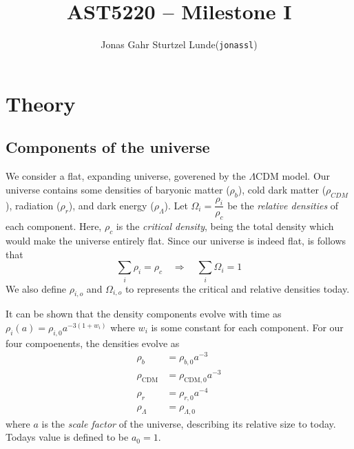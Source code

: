 \documentclass[10pt, a4paper]{article}
\begin{document}
\title{AST5220 -- Milestone I}
\author{
    \begin{tabular}{r l}
        Jonas Gahr Sturtzel Lunde & (\texttt{jonassl})
    \end{tabular}}

\maketitle
\vspace{2cm}

\section{Theory}
\subsection{Components of the universe}
We consider a flat, expanding universe, goverened by the $\Lambda \text{CDM}$ model. Our universe contains some densities of baryonic matter ($\rho_b$), cold dark matter ($\rho_{CDM}$), radiation ($\rho_r$), and dark energy ($\rho_\Lambda$). Let $\Omega_i = \dfrac{\rho_i}{\rho_c}$ be the \textit{relative densities} of each component. Here, $\rho_c$ is the \textit{critical density}, being the total density which would make the universe entirely flat. Since our universe is indeed flat, is follows that
\begin{equation}\label{eqn:sum1}
    \sum_i \rho_i = \rho_c \quad \Rightarrow \quad \sum_i \Omega_i = 1
\end{equation}
We also define $\rho_{i,o}$ and $\Omega_{i,o}$ to represents the critical and relative densities today.

It can be shown \cite{ModernCosmology2003} that the density components evolve with time as $\rho_i(a) = \rho_{i,0}a^{-3(1+w_i)}$ where $w_i$ is some constant for each component. For our four compoenents, the densities evolve as
\begin{align*}
    \rho_b &= \rho_{b,0} a^{-3} \\
    \rho_\text{CDM} &= \rho_{\text{CDM},0} a^{-3} \\
    \rho_r &= \rho_{r,0} a^{-4} \\
    \rho_\Lambda &= \rho_{\Lambda,0}
\end{align*}
where $a$ is the \textit{scale factor} of the universe, describing its relative size to today. Todays value is defined to be $a_0 = 1$.
\end{document}
